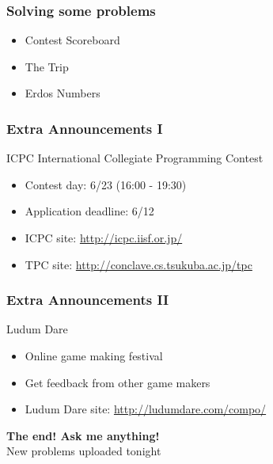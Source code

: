 \documentclass{beamer}
\begin{document}

\begin{frame}
  \frametitle{Solving some problems}
  \begin{itemize}
  \item Contest Scoreboard
  \item The Trip
  \item Erdos Numbers
  \end{itemize}
\end{frame}

\begin{frame}
  \frametitle{Extra Announcements I}
  \begin{block}{ICPC International Collegiate Programming Contest}
    \begin{itemize}
    \item Contest day: 6/23 (16:00 - 19:30)
    \item Application deadline: 6/12
    \item ICPC site: \url{http://icpc.iisf.or.jp/}
    \item TPC site: \url{http://conclave.cs.tsukuba.ac.jp/tpc}
    \end{itemize}
  \end{block}
\end{frame}

\begin{frame}
  \frametitle{Extra Announcements II}
  \begin{block}{Ludum Dare}
    \begin{itemize}
    \item Online game making festival
    \item Get feedback from other game makers
    \item Ludum Dare site: \url{http://ludumdare.com/compo/}
    \end{itemize}
  \end{block}
\end{frame}

\begin{frame}
  \begin{center}
    {\bf The end! Ask me anything!}\\
    New problems uploaded tonight
  \end{center}
\end{frame}
\end{document}
